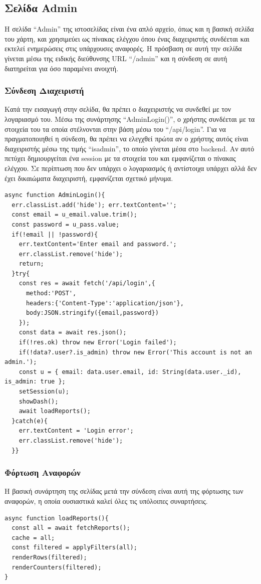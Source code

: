 \subsection{Σελίδα Admin}
Η σελίδα “Admin” της ιστοσελίδας είναι ένα απλό αρχείο, όπως και η βασική σελίδα του χάρτη, και χρησιμεύει ως πίνακας ελέγχου όπου ένας διαχειριστής συνδέεται και εκτελεί ενημερώσεις στις υπάρχουσες αναφορές. Η πρόσβαση σε αυτή την σελίδα γίνεται μέσω της ειδικής διεύθυνσης URL “/admin” και η σύνδεση σε αυτή διατηρείται για όσο παραμένει ανοιχτή.

\subsubsection*{Σύνδεση Διαχειριστή}
Κατά την εισαγωγή στην σελίδα, θα πρέπει ο διαχειριστής να συνδεθεί με τον λογαριασμό του. Μέσω της συνάρτησης “AdminLogin()”, ο χρήστης συνδέεται με τα στοιχεία του τα οποία στέλνονται στην βάση μέσω του “/api/login”. Για να πραγματοποιηθεί η σύνδεση, θα πρέπει να ελεγχθεί πρώτα αν ο χρήστης αυτός είναι διαχειριστής μέσω της τιμής “is\textunderscore admin”, το οποίο γίνεται μέσα στο backend. Αν αυτό πετύχει δημιουργείται ένα session με τα στοιχεία του και εμφανίζεται ο πίνακας ελέγχου. Σε περίπτωση που δεν υπάρχει ο λογαριασμός ή αντίστοιχα υπάρχει αλλά δεν έχει δικαιώματα διαχειριστή, εμφανίζεται σχετικό μήνυμα.
\\
\begin{lstlisting}
async function AdminLogin(){
  err.classList.add('hide'); err.textContent='';
  const email = u_email.value.trim();
  const password = u_pass.value;
  if(!email || !password){
    err.textContent='Enter email and password.';
    err.classList.remove('hide');
    return;
  }try{
    const res = await fetch('/api/login',{
      method:'POST',
      headers:{'Content-Type':'application/json'},
      body:JSON.stringify({email,password})
    });
    const data = await res.json();
    if(!res.ok) throw new Error('Login failed');
    if(!data?.user?.is_admin) throw new Error('This account is not an admin.');
    const u = { email: data.user.email, id: String(data.user._id), is_admin: true };
    setSession(u);
    showDash();
    await loadReports();
  }catch(e){
    err.textContent = 'Login error';
    err.classList.remove('hide');
  }}
\end{lstlisting}

\subsubsection*{Φόρτωση Αναφορών}
Η βασική συνάρτηση της σελίδας μετά την σύνδεση είναι αυτή της φόρτωσης των αναφορών, η οποία ουσιαστικά καλεί όλες τις υπόλοιπες συναρτήσεις.
\\
\begin{lstlisting}
async function loadReports(){
  const all = await fetchReports();
  cache = all;
  const filtered = applyFilters(all);
  renderRows(filtered);
  renderCounters(filtered);
}
\end{lstlisting}

